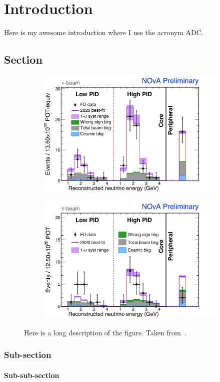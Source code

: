 

\chapter{Introduction}\label{chap:introduction}

Here is my awesome introduction where I use the acronym \gls{ADC}.

\section{Section}
\begin{figure}
	\centering
	\begin{subfigure}{.49\textwidth}
		\centering
		\includegraphics[width=\linewidth]{Chapter_Introduction/Plots/NOvA_NueFD_FHC.pdf}
		\caption{}
		\label{fig:nue20201}
	\end{subfigure}
	\begin{subfigure}{.49\textwidth}
		\centering
		\includegraphics[width=\linewidth]{Chapter_Introduction/Plots/NOvA_NueFD_RHC.pdf}
		\caption{}
		\label{fig:nue20202}
	\end{subfigure} 
	\caption[Here is a short description of the figure.]{Here is a long description of the figure. Taken from~\cite{book:markyT}.}
	\label{fig:nue2020}
\end{figure}

\subsection{Sub-section}
\subsubsection{Sub-sub-section}

